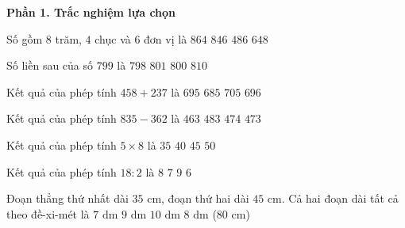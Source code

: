 \textbf{Phần 1. Trắc nghiệm lựa chọn}

\begin{ex} %
Số gồm $8$ trăm, $4$ chục và $6$ đơn vị là
\choice
{$864$}
{\True $846$}
{$486$}
{$648$}
\end{ex}

\begin{ex} %
Số liền sau của số $799$ là
\choice
{$798$}
{$801$}
{\True $800$}
{$810$}
\end{ex}

\begin{ex} %
Kết quả của phép tính $458 + 237$ là
\choice
{\True $695$}
{$685$}
{$705$}
{$696$}
\end{ex}

\begin{ex} %
Kết quả của phép tính $835 - 362$ là
\choice
{$463$}
{$483$}
{$474$}
{\True $473$}
\end{ex}

\begin{ex} %
Kết quả của phép tính $5 \times 8$ là
\choice
{$35$}
{\True $40$}
{$45$}
{$50$}
\end{ex}

\begin{ex} %
Kết quả của phép tính $18 : 2$ là
\choice
{$8$}
{$7$}
{\True $9$}
{$6$}
\end{ex}

\begin{ex} %
Đoạn thẳng thứ nhất dài $35\text{ cm}$, đoạn thứ hai dài $45\text{ cm}$. Cả hai đoạn dài tất cả theo đề-xi-mét là
\choice
{$7\text{ dm}$}
{$9\text{ dm}$}
{$10\text{ dm}$}
{\True $8\text{ dm}$ ($80\text{ cm}$)}
\end{ex}

